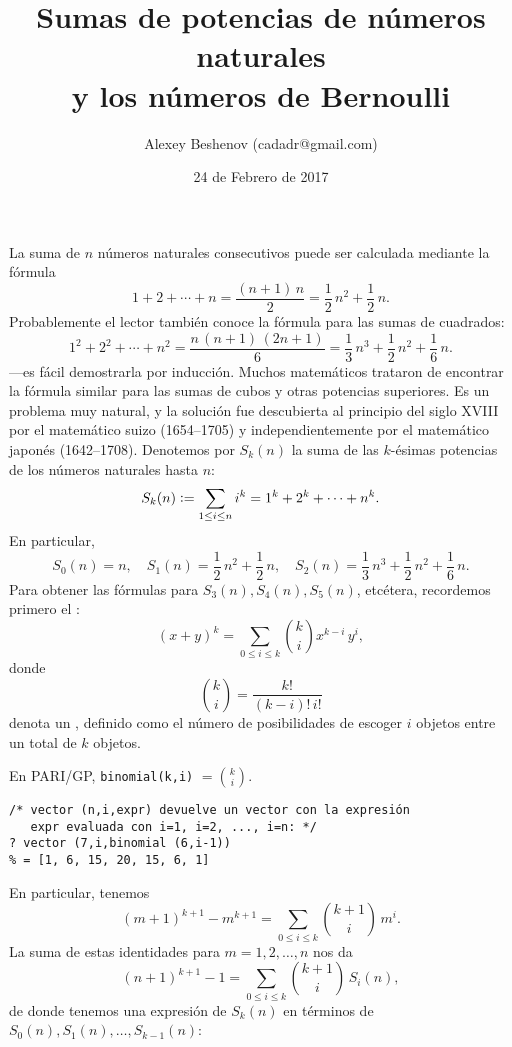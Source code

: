 \documentclass{article}
\author{Alexey Beshenov (cadadr@gmail.com)}
\title{Sumas de potencias de números naturales\\y los números de Bernoulli}
\date{24 de Febrero de 2017}
\begin{document}
{\normalfont\sffamily\bfseries \maketitle}

La suma de $n$ números naturales consecutivos puede ser calculada mediante la fórmula
$$1+2+\cdots+n = \frac{(n+1)\,n}{2} = \frac{1}{2}\,n^2 + \frac{1}{2}\,n.$$
Probablemente el lector también conoce la fórmula para las sumas de cuadrados:
$$1^2 + 2^2 + \cdots + n^2 = \frac{n\,(n+1)\,(2n + 1)}{6} = \frac{1}{3}\,n^3 + \frac{1}{2}\,n^2 + \frac{1}{6}\,n.$$
---es fácil demostrarla por inducción. Muchos matemáticos trataron de encontrar la fórmula similar para las sumas de cubos y otras potencias superiores. Es un problema muy natural, y la solución fue descubierta al principio del siglo XVIII por el matemático suizo  (1654--1705) y independientemente por el matemático japonés  (1642--1708). Denotemos por $S_k (n)$ la suma de las $k$-ésimas potencias de los números naturales hasta $n$:
$$S_k (n) \mathrel{\mathop:}= \sum_{1 \le i \le n} i^k = 1^k + 2^k + \cdots + n^k.$$
En particular,
$$S_0 (n) = n, \quad S_1 (n) = \frac{1}{2}\,n^2 + \frac{1}{2}\,n, \quad S_2 (n) = \frac{1}{3}\,n^3 + \frac{1}{2}\,n^2 + \frac{1}{6}\,n.$$
Para obtener las fórmulas para $S_3 (n), S_4 (n), S_5 (n)$, etcétera, recordemos primero el :
$$(x+y)^k = \sum_{0 \le i \le k} {k \choose i} x^{k-i}\,y^i,$$
donde
$${k \choose i} = \frac{k!}{(k-i)!\,i!}$$
denota un , definido como el número de posibilidades de escoger $i$ objetos entre un total de $k$ objetos.

\begin{shaded}
\small\noindent En PARI/GP, \verb|binomial(k,i)| $= {k\choose i}$.

\begin{verbatim}
/* vector (n,i,expr) devuelve un vector con la expresión
   expr evaluada con i=1, i=2, ..., i=n: */
? vector (7,i,binomial (6,i-1))
% = [1, 6, 15, 20, 15, 6, 1]
\end{verbatim}
\end{shaded}

En particular, tenemos
$$(m+1)^{k+1} - m^{k+1} = \sum_{0 \le i \le k} {k+1 \choose i}\,m^i.$$
La suma de estas identidades para $m = 1, 2, \ldots, n$ nos da
$$(n+1)^{k+1} - 1 = \sum_{0 \le i \le k} {k+1 \choose i}\,S_i (n),$$
de donde tenemos una expresión de $S_k (n)$ en términos de $S_0 (n), S_1 (n), \ldots, S_{k-1} (n)$:
\end{document}
